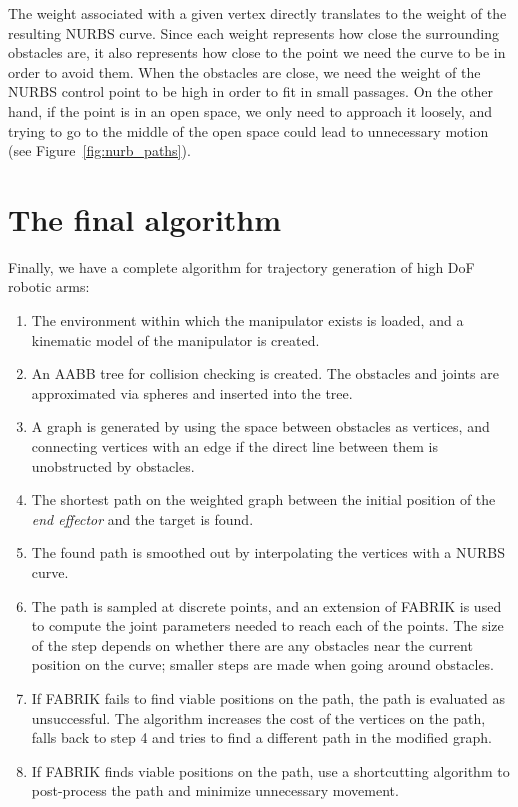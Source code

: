 The weight associated with a given vertex directly translates to the weight of the resulting NURBS curve. Since each weight represents how close the surrounding obstacles are, it also represents how close to the point we need the curve to be in order to avoid them. When the obstacles are close, we need the weight of the NURBS control point to be high in order to fit in small passages. On the other hand, if the point is in an open space, we only need to approach it loosely, and trying to go to the middle of the open space could lead to unnecessary motion (see Figure~\ref{fig:nurb_paths}).

\section{The final algorithm}

Finally, we have a complete algorithm for trajectory generation of high DoF robotic arms:

\begin{enumerate}
\item The environment within which the manipulator exists is loaded, and a kinematic model of the manipulator is created.
\item An AABB tree for collision checking is created. The obstacles and joints are approximated via spheres and inserted into the tree.
\item A graph is generated by using the space between obstacles as vertices, and connecting vertices with an edge if the direct line between them is unobstructed by obstacles.
\item The shortest path on the weighted graph between the initial position of the \textit{end effector} and the target is found.
\item The found path is smoothed out by interpolating the vertices with a NURBS curve.
\item The path is sampled at discrete points, and an extension of FABRIK is used to compute the joint parameters needed to reach each of the points. The size of the step depends on whether there are any obstacles near the current position on the curve; smaller steps are made when going around obstacles.
\item If FABRIK fails to find viable positions on the path, the path is evaluated as unsuccessful. The algorithm increases the cost of the vertices on the path, falls back to step 4 and tries to find a different path in the modified graph.
\item If FABRIK finds viable positions on the path, use a shortcutting algorithm to post-process the path and minimize unnecessary movement.
\end{enumerate}

